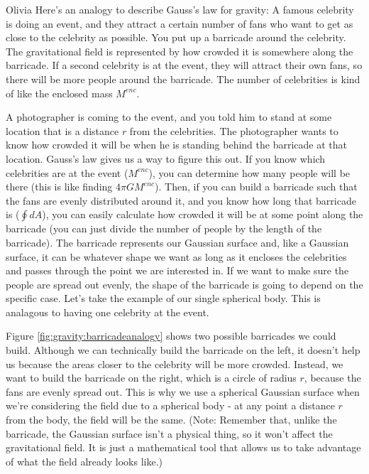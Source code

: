 \begin{studentOpinion}{Olivia} Here's an analogy to describe Gauss's law for gravity: A famous celebrity is doing an event, and they attract a certain number of fans who want to get as close to the celebrity as possible. You put up a barricade around the celebrity. The gravitational field is represented by how crowded it is somewhere along the barricade. If a second celebrity is at the event, they will attract their own fans, so there will be more people around the barricade. The number of celebrities is kind of like the enclosed mass $M^{enc}$. 

A photographer is coming to the event, and you told him to stand at some location that is a distance $r$ from the celebrities. The photographer wants to know how crowded it will be when he is standing behind the barricade at that location. Gauss's law gives us a way to figure this out. If you know which celebrities are at the event ($M^{enc}$), you can determine how many people will be there (this is like finding $4\pi GM^{enc}$). Then, if you can build a barricade such that the fans are evenly distributed around it, and you know how long that barricade is ($\oint dA$), you can easily calculate how crowded it will be at some point along the barricade (you can just divide the number of people by the length of the barricade). 
\newpage
The barricade represents our Gaussian surface and, like a Gaussian surface, it can be whatever shape we want as long as it encloses the celebrities and passes through the point we are interested in. If we want to make sure the people are spread out evenly, the shape of the barricade is going to depend on the specific case. Let's take the example of our single spherical body. This is analagous to having one celebrity at the event.

Figure \ref{fig:gravity:barricadeanalogy} shows two possible barricades we could build. Although we can technically build the barricade on the left, it doesn't help us because the areas closer to the celebrity will be more crowded. Instead, we want to build the barricade on the right, which is a circle of radius $r$, because the fans are evenly spread out. This is why we use a spherical Gaussian surface when we're considering the field due to a spherical body - at any point a distance $r$ from the body, the field will be the same. (Note: Remember that, unlike the barricade, the Gaussian surface isn't a physical thing, so it won't affect the gravitational field. It is just a mathematical tool that allows us to take advantage of what the field already looks like.)
\end{studentOpinion}


